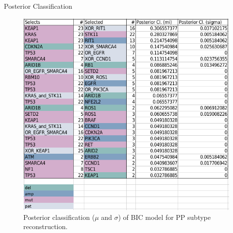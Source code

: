 \documentclass{beamer}
\begin{document}
\begin{frame}{Posterior Classification}
{\begin{figure}
            \includegraphics[scale = 0.4]{img/post_bic_PP.png}
            \caption{Posterior classification ($\mu$ and $\sigma$) of BIC model for PP subtype reconstruction.}
        \end{figure}
    }
    
\end{frame}
\end{document}
